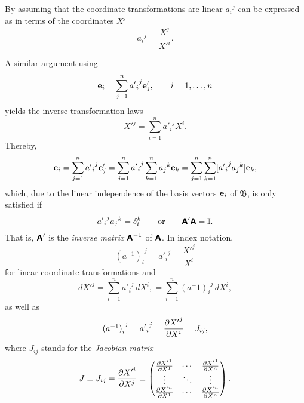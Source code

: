 By assuming that the coordinate transformations are linear ${a_i}^j$ can be expressed as in terms of the coordinates $X^j$
\begin{equation}
{a_i}^j =\frac{  X^j }{  X'^i}  .
\label{2001-mu-tensor-tl1}
\end{equation}

A similar argument using
\begin{equation}
{\bf e}_i=\sum_{j=1}^n {{a'}_i}^j {\bf e}'_j, \qquad i=1,\ldots , n
\label{2012-m-ch-tlcbv}
\end{equation}
yields the inverse transformation laws
\begin{equation}
{X'}^j   = \sum_{i=1}^n {{a'}_i}^j{X}^i.
\end{equation}
Thereby,
\begin{equation}
{\bf e}_i=\sum_{j=1}^n {{a'}_i}^j {\bf e}'_j
=\sum_{j=1}^n {{a'}_i}^j \sum_{k=1}^n {a_j}^k {\bf e}_k
=\sum_{j=1}^n \sum_{k=1}^n [{{a'}_i}^j {a_j}^k] {\bf e}_k,
\end{equation}
which, due to the linear independence of the basis vectors ${\bf e}_i$ of ${\mathfrak B}$,
is only satisfied if
\begin{equation}
{{a'}_i}^j {a_j}^k =\delta_i^k
\qquad
{\rm or}
\qquad
\textsf{\textbf{A}}'\textsf{\textbf{A}}={\Bbb I}.
\end{equation}
That is, $\textsf{\textbf{A}}'$ is the {\em inverse matrix}
$\textsf{\textbf{A}}^{-1}$  of $\textsf{\textbf{A}}$. In index notation,
\begin{equation}
{(a^{-1})_i}^j = {{a'}_i}^j =\frac{ {X'}^j }{   X^i}
\label{2001-mu-tensor-tl2}
\end{equation}
for linear   coordinate transformations and
\begin{equation}
d{X'}^j   =
\sum_{i=1}^n {{a'}_i}^j\, d{X}^i,
=
\sum_{i=1}^n {{({a^-1})}_i}^j\, d{X}^i,
\end{equation}
as well as
\begin{equation}
{{(a^{-1})}_i}^j =
{{a'}_i}^j =
{\partial {X'}^j \over \partial X^i}   =J_{ij},
\label{2001-mu-tensor-tl2nl}
\end{equation}
where $J_{ij}$ stands for
the {\em Jacobian matrix}
\begin{equation}
J\equiv
J_{ij}={\partial {X'}^i\over \partial {X}^j }
\equiv
\begin{pmatrix}
{\partial {X'}^1\over \partial {X}^1}&\cdots&{\partial {X'}^1\over \partial {X}^n}\\
\vdots&\ddots &\vdots\\
{\partial {X'}^n\over \partial {X}^1}&\cdots&{\partial {X'}^n\over \partial {X}^n}
\end{pmatrix} .
\label{2013-m-t-jm}
\end{equation}


